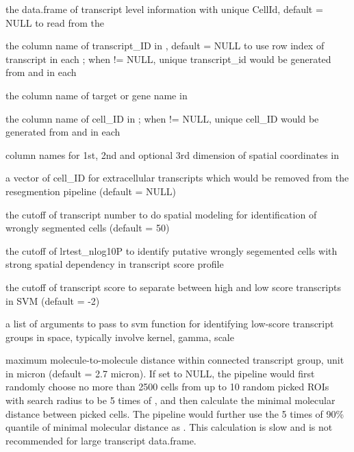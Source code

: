 \documentclass[letterpaper]{book}
\begin{document}
\begin{Arguments}
\begin{ldescription}
\item[\code{transcript\_df}] the data.frame of transcript level information with unique CellId, default = NULL to read from the 

\item[\code{transID\_coln}] the column name of transcript\_ID in , default = NULL to use row index of transcript in each ; when  != NULL, unique transcript\_id would be generated from  and  in each 

\item[\code{transGene\_coln}] the column name of target or gene name in 

\item[\code{cellID\_coln}] the column name of cell\_ID in ; when  != NULL, unique cell\_ID would be generated from  and  in each 

\item[\code{spatLocs\_colns}] column names for 1st, 2nd and optional 3rd dimension of spatial coordinates in 

\item[\code{extracellular\_cellID}] a vector of cell\_ID for extracellular transcripts which would be removed from the resegmention pipeline (default = NULL)

\item[\code{flagModel\_TransNum\_cutoff}] the cutoff of transcript number to do spatial modeling for identification of wrongly segmented cells (default = 50)

\item[\code{flagCell\_lrtest\_cutoff}] the cutoff of lrtest\_nlog10P to identify putative wrongly segemented cells with strong spatial dependency in transcript score profile

\item[\code{svmClass\_score\_cutoff}] the cutoff of transcript score to separate between high and low score transcripts in SVM (default = -2)

\item[\code{svm\_args}] a list of arguments to pass to svm function for identifying low-score transcript groups in space, typically involve kernel, gamma, scale

\item[\code{molecular\_distance\_cutoff}] maximum molecule-to-molecule distance within connected transcript group, unit in micron (default = 2.7 micron).
If set to NULL, the pipeline would first randomly choose no more than 2500 cells from up to 10 random picked ROIs with search radius to be 5 times of , and then calculate the minimal molecular distance between picked cells. The pipeline would further use the 5 times of 90\% quantile of minimal molecular distance as . This calculation is slow and is not recommended for large transcript data.frame.


\end{ldescription}
\end{Arguments}
\end{document}
